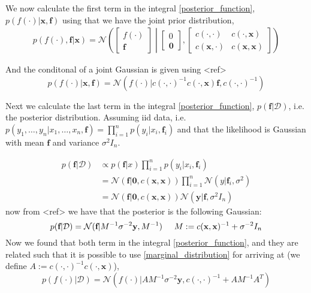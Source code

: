 We now calculate the first term in the integral \eqref{posterior_function}, 
$p(f(\cdot)|\textbf{x}, \textbf{f})$ using that we have the joint prior 
distribution, 
\begin{align}
    p(f(\cdot),\textbf{f}|\textbf{x}) = \mathcal{N}\left(\begin{bmatrix}
        f(\cdot)\\ \textbf{f}
    \end{bmatrix} \middle| \begin{bmatrix}
        0\\ \textbf{0}
    \end{bmatrix}, \begin{bmatrix}
        c(\cdot, \cdot) & c(\cdot,\textbf{x})\\
        c(\textbf{x}, \cdot) & c(\textbf{x}, \textbf{x})
    \end{bmatrix} \right)
\end{align}

And the conditonal of a joint Gaussian is given using <ref> 
$$p(f(\cdot)|\textbf{x}, \textbf{f}) = \mathcal{N}(f(\cdot)|c(\cdot, \cdot)^{-1}c(\cdot, \textbf{x})\textbf{f}, c(\cdot, \cdot)^{-1})$$

Next we calculate the last term in the integral \eqref{posterior_function}, 
$p(\textbf{f}|\mathcal{D})$, i.e. the posterior distribution. Assuming iid data, 
i.e. $p(y_1,\dots, y_n|x_1,\dots, x_n, \textbf{f}) = \prod_{i=1}^n p(y_i|x_i,\textbf{f}_i)$
and that the likelihood is Gaussian with mean $\textbf{f}$ and variance $\sigma^2 I_n$. 

\begin{align*}
    p(\textbf{f}|\mathcal{D}) &\propto p(\textbf{f}|x)\prod_{i=1}^n p(y_i|x_i,\textbf{f}_i)\\
    &= \mathcal{N}(\textbf{f}|\textbf{0},c(\textbf{x}, \textbf{x})) \prod_{i=1}^n \mathcal{N}(y|\textbf{f}_i,\sigma^2)\\
    &= \mathcal{N}(\textbf{f}|\textbf{0}, c(\textbf{x}, \textbf{x})) \mathcal{N}(\textbf{y}|\textbf{f},\sigma^2 I_n)
\end{align*}
now from <ref> we have that the posterior is the following Gaussian: 
\begin{equation*}
    p(\textbf{f}|\mathcal{D}) = \mathcal{N}(\textbf{f}|M^{-1} \sigma^{-2}\textbf{y}, M^{-1}) \hspace{0.5cm}M := c(\textbf{x}, \textbf{x})^{-1}+\sigma^{-2} I_n
\end{equation*}
Now we found that both term in the integral \eqref{posterior_function}, and they
are related such that it is possible to use \eqref{marginal_distribution} for arriving 
at (we define $A :=  c(\cdot, \cdot)^{-1} c(\cdot, \textbf{x})$), 
$$p(f(\cdot)|\mathcal{D}) = \mathcal{N}(f(\cdot)|AM^{-1}\sigma^{-2}\textbf{y}, c(\cdot, \cdot)^{-1}+
AM^{-1}A^T)$$

